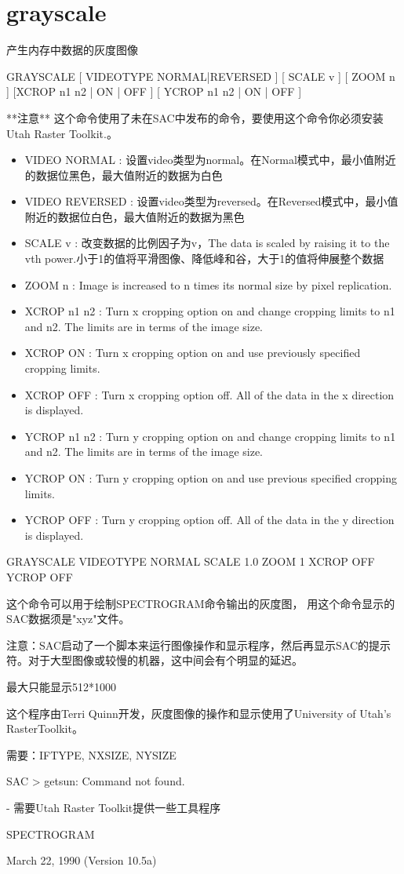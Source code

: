 \section{grayscale}
\label{cmd:grayscale}

产生内存中数据的灰度图像

GRAYSCALE [ VIDEOTYPE NORMAL|REVERSED ] [ SCALE v ] [ ZOOM n ] [XCROP n1 n2 | ON | OFF ] [ YCROP n1 n2 | ON | OFF ]

**注意** 这个命令使用了未在SAC中发布的命令，要使用这个命令你必须安装Utah 	Raster Toolkit.。

\begin{itemize}
\item VIDEO NORMAL : 设置video类型为normal。在Normal模式中，最小值附近的数据位黑色，最大值附近的数据为白色
\item VIDEO REVERSED : 设置video类型为reversed。在Reversed模式中，最小值附近的数据位白色，最大值附近的数据为黑色
\item SCALE v : 改变数据的比例因子为v，The data is scaled by raising it to the vth power.小于1的值将平滑图像、降低峰和谷，大于1的值将伸展整个数据
\item ZOOM n : Image is increased to n times its normal size by pixel replication.
\item XCROP n1 n2 : Turn x cropping option on and change cropping limits to n1 and n2. The limits are in terms of the image size.
\item XCROP {ON} : Turn x cropping option on and use previously specified cropping limits.
\item XCROP OFF :  Turn x cropping option off.  All of the data in the x direction is displayed.
\item YCROP n1 n2 : Turn y cropping option on and change cropping limits to n1 and n2. The limits are in terms of the image size.
\item YCROP {ON} : Turn y cropping option on and use previous specified cropping limits.
\item YCROP OFF :  Turn y cropping option off.  All of the data in the y direction is displayed. 
\end{itemize}

GRAYSCALE VIDEOTYPE NORMAL SCALE 1.0 ZOOM 1 XCROP OFF YCROP OFF

这个命令可以用于绘制SPECTROGRAM命令输出的灰度图， 用这个命令显示的SAC数据须是"xyz"文件。

注意：SAC启动了一个脚本来运行图像操作和显示程序，然后再显示SAC的提示符。对于大型图像或较慢的机器，这中间会有个明显的延迟。

最大只能显示512*1000

这个程序由Terri Quinn开发，灰度图像的操作和显示使用了University of Utah's RasterToolkit。

需要：IFTYPE, NXSIZE, NYSIZE

SAC > getsun: Command not found.  

- 需要Utah Raster Toolkit提供一些工具程序

SPECTROGRAM

March 22, 1990 (Version 10.5a)
